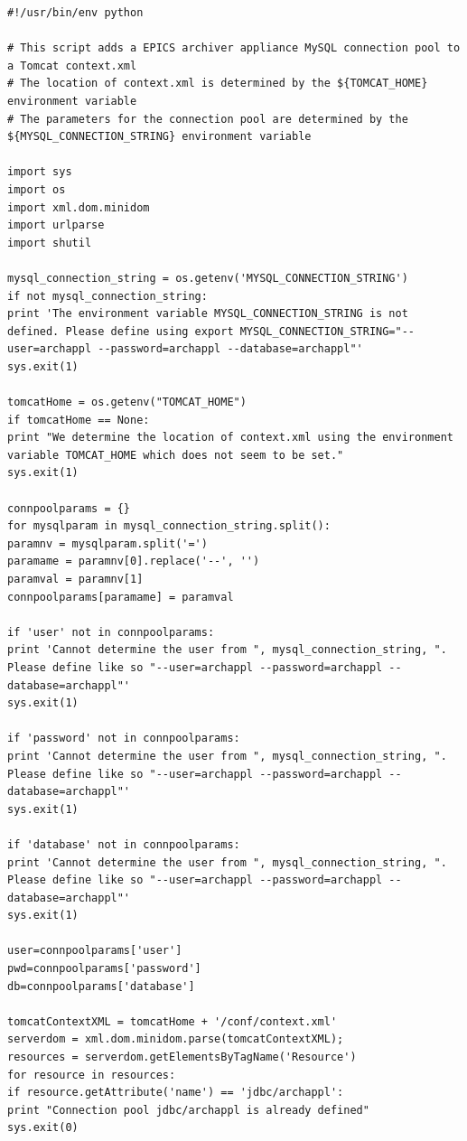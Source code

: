 \documentclass[11pt
  , a4paper
  , article
  , oneside
]{memoir}
\begin{document}
\begin{lstlisting}[style=termstyle]
#!/usr/bin/env python

# This script adds a EPICS archiver appliance MySQL connection pool to a Tomcat context.xml
# The location of context.xml is determined by the ${TOMCAT_HOME} environment variable
# The parameters for the connection pool are determined by the ${MYSQL_CONNECTION_STRING} environment variable  

import sys
import os
import xml.dom.minidom
import urlparse
import shutil

mysql_connection_string = os.getenv('MYSQL_CONNECTION_STRING')
if not mysql_connection_string:
print 'The environment variable MYSQL_CONNECTION_STRING is not defined. Please define using export MYSQL_CONNECTION_STRING="--user=archappl --password=archappl --database=archappl"'
sys.exit(1)

tomcatHome = os.getenv("TOMCAT_HOME")
if tomcatHome == None:
print "We determine the location of context.xml using the environment variable TOMCAT_HOME which does not seem to be set."
sys.exit(1)

connpoolparams = {}
for mysqlparam in mysql_connection_string.split():
paramnv = mysqlparam.split('=')
paramame = paramnv[0].replace('--', '')
paramval = paramnv[1]
connpoolparams[paramame] = paramval

if 'user' not in connpoolparams:
print 'Cannot determine the user from ", mysql_connection_string, ". Please define like so "--user=archappl --password=archappl --database=archappl"'
sys.exit(1)

if 'password' not in connpoolparams:
print 'Cannot determine the user from ", mysql_connection_string, ". Please define like so "--user=archappl --password=archappl --database=archappl"'
sys.exit(1)

if 'database' not in connpoolparams:
print 'Cannot determine the user from ", mysql_connection_string, ". Please define like so "--user=archappl --password=archappl --database=archappl"'
sys.exit(1)

user=connpoolparams['user']
pwd=connpoolparams['password']
db=connpoolparams['database']

tomcatContextXML = tomcatHome + '/conf/context.xml'
serverdom = xml.dom.minidom.parse(tomcatContextXML);
resources = serverdom.getElementsByTagName('Resource')
for resource in resources:
if resource.getAttribute('name') == 'jdbc/archappl':
print "Connection pool jdbc/archappl is already defined"
sys.exit(0)



\end{lstlisting}
\end{document}
